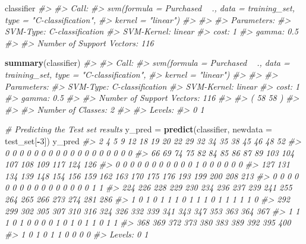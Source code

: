 \documentclass[]{book}
\newenvironment{Shaded}{\begin{snugshade}}{\end{snugshade}}
\newcommand{\CommentTok}[1]{\textcolor[rgb]{0.56,0.35,0.01}{\textit{#1}}}
\newcommand{\DataTypeTok}[1]{\textcolor[rgb]{0.13,0.29,0.53}{#1}}
\newcommand{\DecValTok}[1]{\textcolor[rgb]{0.00,0.00,0.81}{#1}}
\newcommand{\KeywordTok}[1]{\textcolor[rgb]{0.13,0.29,0.53}{\textbf{#1}}}
\newcommand{\NormalTok}[1]{#1}
\newcommand{\OperatorTok}[1]{\textcolor[rgb]{0.81,0.36,0.00}{\textbf{#1}}}
\newcommand{\StringTok}[1]{\textcolor[rgb]{0.31,0.60,0.02}{#1}}
\begin{document}
\begin{Shaded}
\begin{Highlighting}[]
\NormalTok{classifier}
\CommentTok{#> }
\CommentTok{#> Call:}
\CommentTok{#> svm(formula = Purchased ~ ., data = training_set, type = "C-classification", }
\CommentTok{#>     kernel = "linear")}
\CommentTok{#> }
\CommentTok{#> }
\CommentTok{#> Parameters:}
\CommentTok{#>    SVM-Type:  C-classification }
\CommentTok{#>  SVM-Kernel:  linear }
\CommentTok{#>        cost:  1 }
\CommentTok{#>       gamma:  0.5 }
\CommentTok{#> }
\CommentTok{#> Number of Support Vectors:  116}
\end{Highlighting}
\end{Shaded}

\begin{Shaded}
\begin{Highlighting}[]
\KeywordTok{summary}\NormalTok{(classifier)}
\CommentTok{#> }
\CommentTok{#> Call:}
\CommentTok{#> svm(formula = Purchased ~ ., data = training_set, type = "C-classification", }
\CommentTok{#>     kernel = "linear")}
\CommentTok{#> }
\CommentTok{#> }
\CommentTok{#> Parameters:}
\CommentTok{#>    SVM-Type:  C-classification }
\CommentTok{#>  SVM-Kernel:  linear }
\CommentTok{#>        cost:  1 }
\CommentTok{#>       gamma:  0.5 }
\CommentTok{#> }
\CommentTok{#> Number of Support Vectors:  116}
\CommentTok{#> }
\CommentTok{#>  ( 58 58 )}
\CommentTok{#> }
\CommentTok{#> }
\CommentTok{#> Number of Classes:  2 }
\CommentTok{#> }
\CommentTok{#> Levels: }
\CommentTok{#>  0 1}
\end{Highlighting}
\end{Shaded}

\begin{Shaded}
\begin{Highlighting}[]
\CommentTok{# Predicting the Test set results }
\NormalTok{y_pred =}\StringTok{ }\KeywordTok{predict}\NormalTok{(classifier, }\DataTypeTok{newdata =}\NormalTok{ test_set[}\OperatorTok{-}\DecValTok{3}\NormalTok{]) }
\NormalTok{y_pred}
\CommentTok{#>   2   4   5   9  12  18  19  20  22  29  32  34  35  38  45  46  48  52 }
\CommentTok{#>   0   0   0   0   0   0   0   0   0   0   0   0   0   0   0   0   0   0 }
\CommentTok{#>  66  69  74  75  82  84  85  86  87  89 103 104 107 108 109 117 124 126 }
\CommentTok{#>   0   0   0   0   0   0   0   0   0   0   0   1   0   0   0   0   0   0 }
\CommentTok{#> 127 131 134 139 148 154 156 159 162 163 170 175 176 193 199 200 208 213 }
\CommentTok{#>   0   0   0   0   0   0   0   0   0   0   0   0   0   0   0   0   1   1 }
\CommentTok{#> 224 226 228 229 230 234 236 237 239 241 255 264 265 266 273 274 281 286 }
\CommentTok{#>   1   0   1   0   1   1   1   0   1   1   1   0   1   1   1   1   1   0 }
\CommentTok{#> 292 299 302 305 307 310 316 324 326 332 339 341 343 347 353 363 364 367 }
\CommentTok{#>   1   1   1   0   1   0   0   0   0   1   0   1   0   1   1   0   1   1 }
\CommentTok{#> 368 369 372 373 380 383 389 392 395 400 }
\CommentTok{#>   1   0   1   0   1   1   0   0   0   0 }
\CommentTok{#> Levels: 0 1}
\end{Highlighting}
\end{Shaded}
\end{document}
